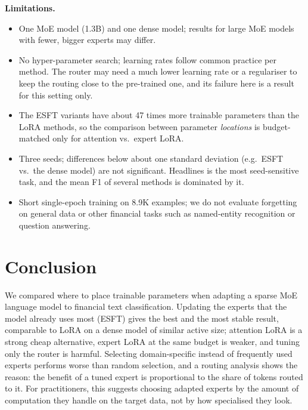 \textbf{Limitations.}
\begin{itemize}
  \item One MoE model (1.3B) and one dense model; results for large MoE models with fewer,
  bigger experts may differ.
  \item No hyper-parameter search; learning rates follow common practice per method. The
  router may need a much lower learning rate or a regulariser to keep the routing close to
  the pre-trained one, and its failure here is a result for this setting only.
  \item The ESFT variants have about 47 times more trainable parameters than the LoRA methods,
  so the comparison between parameter \emph{locations} is budget-matched only for attention
  vs.\ expert LoRA.
  \item Three seeds; differences below about one standard deviation (e.g.\ ESFT vs.\ the dense
  model) are not significant. Headlines is the most seed-sensitive task, and the mean F1 of
  several methods is dominated by it.
  \item Short single-epoch training on 8.9K examples; we do not evaluate forgetting on general
  data or other financial tasks such as named-entity recognition or question answering.
\end{itemize}

\section{Conclusion}
We compared where to place trainable parameters when adapting a sparse MoE language model to
financial text classification. Updating the experts that the model already uses most (ESFT)
gives the best and the most stable result, comparable to LoRA on a dense model of similar
active size; attention LoRA is a strong cheap alternative, expert LoRA at the same budget is
weaker, and tuning only the router is harmful. Selecting domain-specific instead of frequently
used experts performs worse than random selection, and a routing analysis shows the reason:
the benefit of a tuned expert is proportional to the share of tokens routed to it. For
practitioners, this suggests choosing adapted experts by the amount of computation they
handle on the target data, not by how specialised they look.
